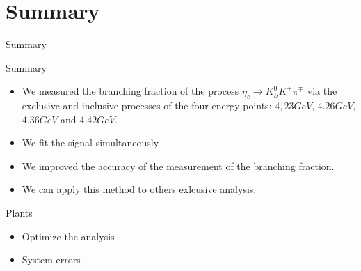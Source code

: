 \documentclass{beamer}
\begin{document}
\section{Summary}
\begin{frame}{Summary}
    \begin{block}{Summary}
        \begin{itemize}
            \item We measured the branching fraction of the process $\eta_c\to K_S^0 K^{\pm} \pi^{\mp}$ via the exclusive and inclusive processes of the four energy points: $4,23 GeV$, $4.26 GeV$, $4.36 GeV$ and $4.42 GeV$.
            \item We fit the signal simultaneously.
            \item We improved the accuracy of the measurement of the branching fraction.
            \item We can apply this method to others exlcusive analysis.
        \end{itemize}
    \end{block}
    \begin{block}{Plants}
        \begin{itemize}
            \item Optimize the analysis
            \item System errors
        \end{itemize}
    \end{block}
\end{frame}
\end{document}
